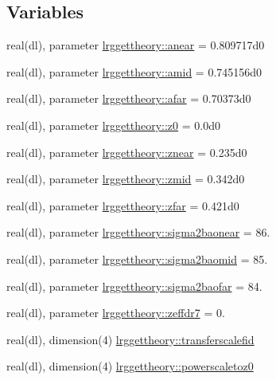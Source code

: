 \subsection*{Variables}
\begin{DoxyCompactItemize}
\item 
real(dl), parameter \mbox{\hyperlink{namespacelrggettheory_ad88af273771f3d0810522480b47f084e}{lrggettheory\+::anear}} = 0.\+809717d0
\item 
real(dl), parameter \mbox{\hyperlink{namespacelrggettheory_a48262968a1e96ae340aba94f24aec1b5}{lrggettheory\+::amid}} = 0.\+745156d0
\item 
real(dl), parameter \mbox{\hyperlink{namespacelrggettheory_aa16430b41b5ca2ad21489fad80db335e}{lrggettheory\+::afar}} = 0.\+70373d0
\item 
real(dl), parameter \mbox{\hyperlink{namespacelrggettheory_a61f36f4870164e55af7c3e7124dc2051}{lrggettheory\+::z0}} = 0.\+0d0
\item 
real(dl), parameter \mbox{\hyperlink{namespacelrggettheory_a8019779a854e5df4d48c67aa0458a991}{lrggettheory\+::znear}} = 0.\+235d0
\item 
real(dl), parameter \mbox{\hyperlink{namespacelrggettheory_adc42a24b86f4427b3cfcd22912853cfa}{lrggettheory\+::zmid}} = 0.\+342d0
\item 
real(dl), parameter \mbox{\hyperlink{namespacelrggettheory_a8666fd6c319e844d505b0506d3615396}{lrggettheory\+::zfar}} = 0.\+421d0
\item 
real(dl), parameter \mbox{\hyperlink{namespacelrggettheory_a60e1f4a4277039bd2beed6d16a68cdb8}{lrggettheory\+::sigma2baonear}} = 86.
\item 
real(dl), parameter \mbox{\hyperlink{namespacelrggettheory_a790fd2fc4eb449f6186182aba3193ffc}{lrggettheory\+::sigma2baomid}} = 85.
\item 
real(dl), parameter \mbox{\hyperlink{namespacelrggettheory_a0b413a1881bdf3f3a733ca712582fad3}{lrggettheory\+::sigma2baofar}} = 84.
\item 
real(dl), parameter \mbox{\hyperlink{namespacelrggettheory_a9e12f939a877e873665d4c49aa5f2ba9}{lrggettheory\+::zeffdr7}} = 0.
\item 
real(dl), dimension(4) \mbox{\hyperlink{namespacelrggettheory_a51576c1d8204fb297c9cde00f78c0a35}{lrggettheory\+::transferscalefid}}
\item 
real(dl), dimension(4) \mbox{\hyperlink{namespacelrggettheory_a8538d769c081d503ae250aa4ddfa538c}{lrggettheory\+::powerscaletoz0}}
\item 

\end{DoxyCompactItemize}
